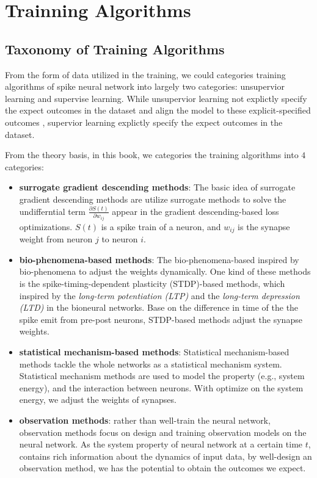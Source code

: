 

\chapter{Trainning Algorithms}

\section{Taxonomy of Training Algorithms}
From the form of data utilized in the training, we could categories training algorithms of spike neural network
into largely two categories: unsupervior learning and supervise learning.
While unsupervior learning not explictly specify the expect outcomes in the dataset and align the model to these
explicit-specified outcomes , supervior learning explictly specify the expect outcomes in the dataset.

From the theory basis, in this book, we categories the training algorithms into $4$ categories:
\begin{itemize}
\item \textbf{surrogate gradient descending methods}: The basic idea of surrogate gradient descending methods
are utilize surrogate methods to solve the undifferntial term $\frac{\partial S(t)}{\partial w_{ij}}$
appear in the gradient descending-based loss optimizations. $S(t)$ is a spike train of a neuron, and $w_{ij}$
is the synapse weight from neuron $j$ to neuron $i$.

\item \textbf{bio-phenomena-based methods}: The bio-phenomena-based inspired by bio-phenomena to adjust the 
weights dynamically. One kind of these methods is the spike-timing-dependent plasticity (STDP)-based methods,
 which inspired by the \textit{long-term potentiation (LTP)} and the \textit{long-term depression (LTD)} in
 the bioneural networks. Base on the difference in time of the the spike emit from pre-post neurons, STDP-based
 methods adjust the synapse weights. 

\item \textbf{statistical mechanism-based methods}:
Statistical mechanism-based methods tackle the whole networks as a statistical mechanism system.
Statistical mechanism methods are used to model the property (e.g., system energy), and the interaction 
between neurons. With optimize on the system energy, we adjust the weights of synapses.

\item \textbf{observation methods}:
rather than well-train the neural network, observation methods focus on design and training 
observation models on the neural network. As the system property of neural network at a certain time $t$,
contains rich information about the dynamics of input data, by well-design an observation method, 
we has the potential to obtain the outcomes we expect.

\end{itemize}



